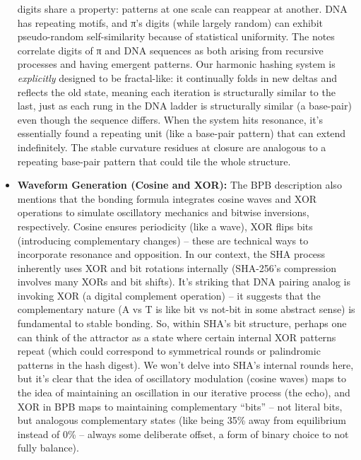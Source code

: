 \documentclass[11pt]{article}
\begin{document}
\begin{itemize}
  digits share a property: patterns at one scale can reappear at
  another. DNA has repeating motifs, and π's digits (while largely
  random) can exhibit pseudo-random self-similarity because of
  statistical uniformity. The notes correlate digits of π and DNA
  sequences as both arising from recursive processes and having emergent
  patterns. Our harmonic hashing system is \emph{explicitly} designed to
  be fractal-like: it continually folds in new deltas and reflects the
  old state, meaning each iteration is structurally similar to the last,
  just as each rung in the DNA ladder is structurally similar (a
  base-pair) even though the sequence differs. When the system hits
  resonance, it's essentially found a repeating unit (like a base-pair
  pattern) that can extend indefinitely. The stable curvature residues
  at closure are analogous to a repeating base-pair pattern that could
  tile the whole structure.
\item
  \textbf{Waveform Generation (Cosine and XOR):} The BPB description
  also mentions that the bonding formula integrates cosine waves and XOR
  operations to simulate oscillatory mechanics and bitwise inversions,
  respectively. Cosine ensures periodicity (like a wave), XOR flips bits
  (introducing complementary changes) -- these are technical ways to
  incorporate resonance and opposition. In our context, the SHA process
  inherently uses XOR and bit rotations internally (SHA-256's
  compression involves many XORs and bit shifts). It's striking that DNA
  pairing analog is invoking XOR (a digital complement operation) -- it
  suggests that the complementary nature (A vs T is like bit vs not-bit
  in some abstract sense) is fundamental to stable bonding. So, within
  SHA's bit structure, perhaps one can think of the attractor as a state
  where certain internal XOR patterns repeat (which could correspond to
  symmetrical rounds or palindromic patterns in the hash digest). We
  won't delve into SHA's internal rounds here, but it's clear that the
  idea of oscillatory modulation (cosine waves) maps to the idea of
  maintaining an oscillation in our iterative process (the echo), and
  XOR in BPB maps to maintaining complementary ``bits'' -- not literal
  bits, but analogous complementary states (like being 35\% away from
  equilibrium instead of 0\% -- always some deliberate offset, a form of
  binary choice to not fully balance).
\end{itemize}
\end{document}
